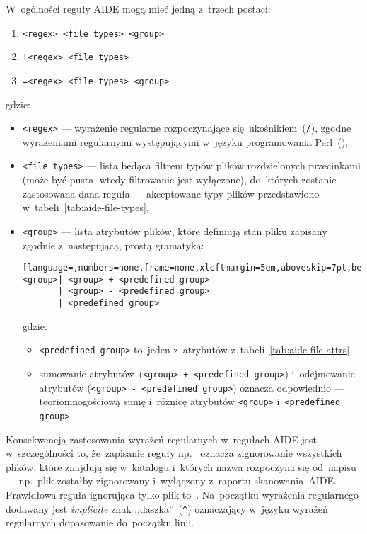 \documentclass[thesis]{subfiles}
\begin{document}
W~ogólności reguły AIDE mogą mieć jedną z~trzech postaci:\mynobreakpar
\begin{enumerate}
	\item \texttt{<regex> <file types> <group>}
	\item \texttt{!<regex> <file types>}
	\item \texttt{=<regex> <file types> <group>}
\end{enumerate}
gdzie:\mynobreakpar
\begin{itemize}
	\item \texttt{<regex>} --- wyrażenie regularne rozpoczynające się~ukośnikiem~(\texttt{/}), zgodne wyrażeniami regularnymi występującymi w~języku programowania \href{https://en.wikipedia.org/wiki/Perl}{Perl}~(),
	\item \texttt{<file types>} --- lista będąca filtrem typów plików rozdzielonych przecinkami (może być pusta, wtedy filtrowanie jest wyłączone), do~których zostanie zastosowana dana reguła --- akceptowane typy plików przedstawiono w~tabeli~\ref{tab:aide-file-types},
	\item \texttt{<group>} --- lista atrybutów plików, które definiują stan pliku zapisany zgodnie z~następującą, prostą gramatyką:\mynobreakpar
\begin{lstlisting}[language=,numbers=none,frame=none,xleftmargin=5em,aboveskip=7pt,belowskip=0pt]
<group>| <group> + <predefined group>
       | <group> - <predefined group>
       | <predefined group>
\end{lstlisting}
	gdzie:\mynobreakpar
	\begin{itemize}
		\item \texttt{<predefined group>} to~jeden z~atrybutów z~tabeli~\ref{tab:aide-file-attrs},
		\item sumowanie atrybutów~(\texttt{<group> + <predefined group>}) i~odejmowanie atrybutów (\texttt{<group> - <predefined~group>}) oznacza odpowiednio --- teoriomnogościową sumę i~różnicę atrybutów \texttt{<group>} i~\texttt{<predefined group>}.
	\end{itemize}
\end{itemize}

Konsekwencją zastosowania wyrażeń regularnych w~regułach AIDE jest w~szczególności to, że~zapisanie reguły np.~ oznacza zignorowanie wszystkich plików, które znajdują się w~katalogu  i~których nazwa rozpoczyna się od~napisu  --- np.~plik  zostałby zignorowany i~wyłączony z~raportu skanowania~AIDE. Prawidłowa reguła ignorująca tylko plik  to~. Na~początku wyrażenia regularnego dodawany jest \emph{implicite} znak ,,daszka''~(\texttt{\textasciicircum}) oznaczający w~języku wyrażeń regularnych dopasowanie do~początku linii.
\end{document}

